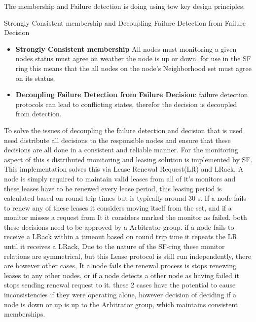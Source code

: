 \documentclass[a4paper,10pt,titlepage]{report}
\begin{document}
The membership and Failure detection is doing using tow key design principles.\\
\vspace{5mm}

Strongly Consistent membership and Decoupling Failure Detection from Failure Decision\\
\vspace{5mm}

\begin{itemize}
    \item \textbf{Strongly Consistent membership} All nodes must monitoring a given nodes status must agree on weather the node is up or down. for use in the SF ring this means that the all nodes on the node's Neighborhood set must agree on its status.
    \item \textbf{Decoupling Failure Detection from Failure Decision}: failure detection protocols can lead to conflicting states, therefor the decision is decoupled from detection.
\end{itemize}
\vspace{5mm}

To solve the issues of decoupling the failure detection and decision that is used need distribute all decisions to the responsible nodes and ensure that these decisions are all done in a consistent and reliable manner. For the monitoring aspect of this s distributed monitoring and leasing solution is implemented by SF. This implementation solves this via Lease Renewal Request(LR) and LRack. A node is simply required to maintain valid leases from all of it's monitors and these leases have to be renewed every lease period, this leasing period is calculated based on round trip times but is typically around 30 s. If a node fails to renew any of these leases it considers moving itself from the set, and if a monitor misses a request from It it considers marked the monitor as failed. both these decisions need to be approved by a Arbitrator group. if a node fails to receive a LRack within a timeout based on round trip time it repeats the LR until it receives a LRack, Due to the nature of the SF-ring these monitor relations are symmetrical, but this Lease protocol is still run independently, there are however other cases, It a node fails the renewal process is stops renewing leases to any other nodes, or if a node detects a other node as having failed it stops sending renewal request to it. these 2 cases have the potential to cause inconsistencies if they were operating alone, however decision of deciding if a node is down or up is up to the Arbitrator group, which maintains consistent memberships. \\
\vspace{5mm}
\end{document}
